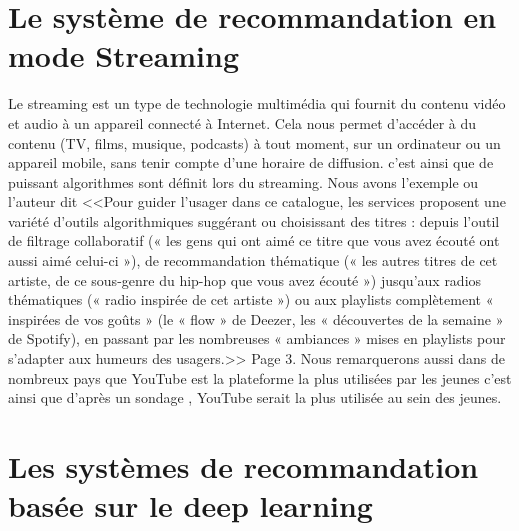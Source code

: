 \documentclass[12pt,a4paper]{article}
\begin{document}
\section{Le système de recommandation en mode Streaming }
Le streaming est un type de technologie multimédia qui fournit du contenu vidéo et audio à un appareil connecté à Internet. Cela nous permet d'accéder à du contenu (TV, films, musique, podcasts) à tout moment, sur un ordinateur ou un appareil mobile, sans tenir compte d'une horaire de diffusion. c'est ainsi que de puissant algorithmes sont définit lors du streaming. Nous avons l'exemple \cite{beuscart2019algorithmes} ou l'auteur dit <<Pour guider l'usager dans ce catalogue, les services proposent une variété d'outils algorithmiques suggérant ou choisissant des titres : depuis l'outil de
filtrage collaboratif (« les gens qui ont aimé ce titre que vous avez écouté ont
aussi aimé celui-ci »), de recommandation thématique (« les autres titres de
cet artiste, de ce sous-genre du hip-hop que vous avez écouté ») jusqu'aux
radios thématiques (« radio inspirée de cet artiste ») ou aux playlists complètement « inspirées de vos goûts » (le « flow » de Deezer, les « découvertes de
la semaine » de Spotify), en passant par les nombreuses « ambiances » mises
en playlists pour s'adapter aux humeurs des usagers.>> Page 3. Nous remarquerons aussi dans de nombreux pays que YouTube est la plateforme la plus utilisées par les jeunes c'est ainsi que d'après un sondage ,\cite{wiard2019qui} YouTube serait la plus utilisée au sein des jeunes. 


\section{Les systèmes de recommandation basée sur le deep learning }
\end{document}
